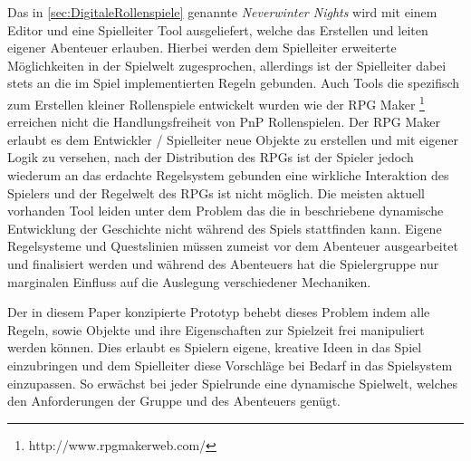 Das in \ref{sec:DigitaleRollenspiele} genannte \emph{Neverwinter Nights} wird mit einem Editor und eine Spielleiter Tool ausgeliefert, welche das Erstellen und leiten eigener Abenteuer erlauben. Hierbei werden dem Spielleiter erweiterte Möglichkeiten in der Spielwelt zugesprochen, allerdings ist der Spielleiter dabei stets an die im Spiel implementierten Regeln gebunden. \cite{Tychsen2006a}\newline
Auch Tools die spezifisch zum Erstellen kleiner Rollenspiele entwickelt wurden wie der RPG Maker \footnote{http://www.rpgmakerweb.com/} erreichen nicht die Handlungsfreiheit von PnP Rollenspielen. Der RPG Maker erlaubt es dem Entwickler / Spielleiter neue Objekte zu erstellen und mit eigener Logik zu versehen, nach der Distribution des RPGs ist der Spieler jedoch wiederum an das erdachte Regelsystem gebunden eine wirkliche Interaktion des Spielers und der Regelwelt des RPGs ist nicht möglich.\newline
Die meisten aktuell vorhanden Tool leiden unter dem Problem das die in \cite{Arinbjarnar} beschriebene dynamische Entwicklung der Geschichte nicht während des Spiels stattfinden kann. Eigene Regelsysteme und Questslinien müssen zumeist vor dem Abenteuer ausgearbeitet und finalisiert werden und während des Abenteuers hat die Spielergruppe nur marginalen Einfluss auf die Auslegung verschiedener Mechaniken.\newline

Der in diesem Paper konzipierte Prototyp behebt dieses Problem indem alle Regeln, sowie Objekte und ihre Eigenschaften zur Spielzeit frei manipuliert werden können. Dies erlaubt es Spielern eigene, kreative Ideen in das Spiel einzubringen und dem Spielleiter diese Vorschläge bei Bedarf in das Spielsystem einzupassen. So erwächst bei jeder Spielrunde eine dynamische Spielwelt, welches den Anforderungen der Gruppe und des Abenteuers genügt.
